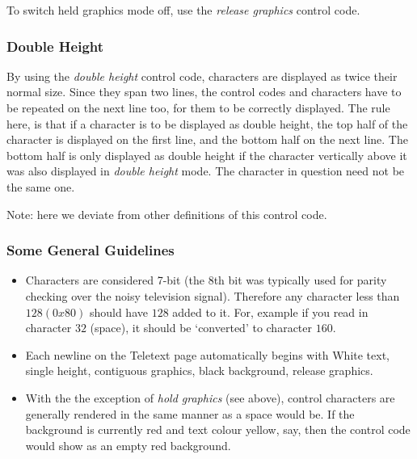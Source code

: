 To switch held graphics mode off, use the {\it release graphics} control code.

\subsubsection*{Double Height}

By using the {\it double height} control code, characters are displayed as twice their
normal size. Since they span two lines, the control codes and characters
have to be repeated on the next line too, for them to be correctly displayed.
The rule here, is that if a character is to be displayed as double height, the top half
of the character is displayed on the first line, and the bottom half on the next line.
The bottom half is only displayed as double height if the character vertically above it was
also displayed in {\it double height} mode. The character in question need not be the same one.

Note: here we deviate from other definitions of this control code.

\subsubsection*{Some General Guidelines}

\begin{itemize}
\item Characters are considered 7-bit (the 8th bit was typically used for parity
checking over the noisy television signal). Therefore any character less
than $128 (0x80)$ should have $128$ added to it. For, example if you
read in character  $32$ (space), it should be `converted' to character $160$.
\item Each newline on the Teletext page automatically begins with
White text, single height, contiguous graphics, black background, release graphics.
\item With the the exception of {\it hold graphics} (see above), control characters are generally rendered in the same manner as a space would
be. If the background is currently red and text colour yellow, say, then the control code would show as an empty red background.
\end{itemize}
